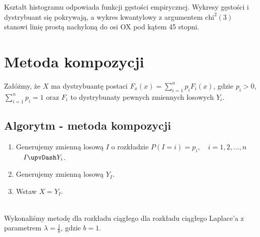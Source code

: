 \documentclass[12pt]{mwart}
\begin{document}
 
  	\noindent Kształt histogramu odpowiada funkcji gęstości empirycznej. Wykresy gęstości i dystrybuant się pokrywają, a wykres kwantylowy z argumentem $\mathrm{chi}^{2}(3)$ stanowi linię prostą nachyloną do osi OX pod kątem 45 stopni.
 
 
 	\section{Metoda kompozycji}
 	\noindent Załóżmy, że $X$ ma dystrybuantę postaci $F_x (x) = \sum_{i=1}^{n} p_i F_i (x)$, gdzie $p_i > 0$, $\sum_{i=1}^{n} p_i = 1$ oraz $F_i$ to dystrybunaty pewnych zmiennych losowych $Y_i$.
 	
 	\subsection{Algorytm - metoda kompozycji}
 	\begin{enumerate}
 		\item Generujemy zmienną losową $I$ o rozkładzie $P(I=i)=p_i, \quad i = 1,2,...,n$ $ \quad I \upvDash Y_i$.
 		\item Generujemy zmienną losową $Y_I$.
 		\item Wstaw $X=Y_I$. \\ \\
 	\end{enumerate}
 	
	\noindent Wykonaliśmy metodę dla rozkładu ciągłego dla rozkładu ciągłego Laplace’a z parametrem $\lambda = \frac{1}{b}$, gdzie $b = 1$. 	
 	
\end{document}
